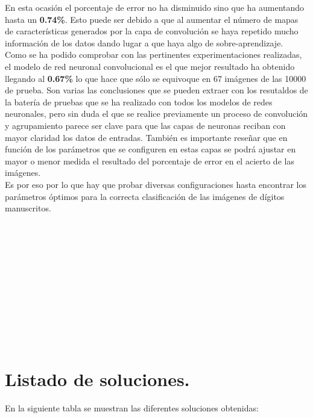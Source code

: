 \documentclass[10pt]{article}
\begin{document}
En esta ocasión el porcentaje de error no ha disminuido sino que ha aumentando hasta un \textbf{0.74\%}. Esto puede ser debido a que al aumentar el número de mapas de características generados por la capa de convolución se haya repetido mucho información de los datos dando lugar a que haya algo de sobre-aprendizaje.\\

Como se ha podido comprobar con las pertinentes experimentaciones realizadas, el modelo de red neuronal convolucional es el que mejor resultado ha obtenido llegando al \textbf{0.67\%} lo que hace que sólo se equivoque en 67 imágenes de las 10000 de prueba. Son varias las conclusiones que se pueden extraer con los resutaldos de la batería de pruebas que se ha realizado con todos los modelos de redes neuronales, pero sin duda el que se realice previamente un proceso de convolución y agrupamiento parece ser clave para que las capas de neuronas reciban con mayor claridad los datos de entradas. También es importante reseñar que en función de los parámetros que se configuren en estas capas se podrá ajustar en mayor o menor medida el resultado del porcentaje de error en el acierto de las imágenes. \\

Es por eso por lo que hay que probar diversas configuraciones hasta encontrar los parámetros óptimos para la correcta clasificación de las imágenes de dígitos manuscritos.\\ \\ \\ \\ \\ \\ \\ \\ \\ \\ \\ \\


\section{Listado de soluciones.}  

En la siguiente tabla se muestran las diferentes soluciones obtenidas:
\end{document}
